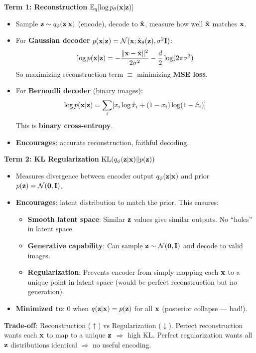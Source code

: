\begin{keybox}
\textbf{Term 1: Reconstruction} $\mathbb{E}_q[\log p_\theta(\mathbf{x}|\mathbf{z})]$
\begin{itemize}
\item Sample $\mathbf{z} \sim q_\phi(\mathbf{z}|\mathbf{x})$ (encode), decode to $\hat{\mathbf{x}}$, measure how well $\hat{\mathbf{x}}$ matches $\mathbf{x}$.
\item For \textbf{Gaussian decoder} $p(\mathbf{x}|\mathbf{z}) = \mathcal{N}(\mathbf{x}; \hat{\mathbf{x}}_\theta(\mathbf{z}), \sigma^2\mathbf{I})$:
$$\log p(\mathbf{x}|\mathbf{z}) = -\frac{\|\mathbf{x} - \hat{\mathbf{x}}\|^2}{2\sigma^2} - \frac{d}{2}\log(2\pi\sigma^2)$$
So maximizing reconstruction term $\equiv$ minimizing \textbf{MSE loss}.
\item For \textbf{Bernoulli decoder} (binary images):
$$\log p(\mathbf{x}|\mathbf{z}) = \sum_i [x_i \log \hat{x}_i + (1-x_i)\log(1-\hat{x}_i)]$$
This is \textbf{binary cross-entropy}.
\item \textbf{Encourages}: accurate reconstruction, faithful decoding.
\end{itemize}

\textbf{Term 2: KL Regularization} $\text{KL}(q_\phi(\mathbf{z}|\mathbf{x}) \| p(\mathbf{z}))$
\begin{itemize}
\item Measures divergence between encoder output $q_\phi(\mathbf{z}|\mathbf{x})$ and prior $p(\mathbf{z}) = \mathcal{N}(\mathbf{0}, \mathbf{I})$.
\item \textbf{Encourages}: latent distribution to match the prior. This ensures:
  \begin{itemize}
  \item \textbf{Smooth latent space}: Similar $\mathbf{z}$ values give similar outputs. No ``holes'' in latent space.
  \item \textbf{Generative capability}: Can sample $\mathbf{z} \sim \mathcal{N}(\mathbf{0}, \mathbf{I})$ and decode to valid images.
  \item \textbf{Regularization}: Prevents encoder from simply mapping each $\mathbf{x}$ to a unique point in latent space (would be perfect reconstruction but no generation).
  \end{itemize}
\item \textbf{Minimized to}: 0 when $q(\mathbf{z}|\mathbf{x}) = p(\mathbf{z})$ for all $\mathbf{x}$ (posterior collapse — bad!).
\end{itemize}

\textbf{Trade-off}: Reconstruction ($\uparrow$) vs Regularization ($\downarrow$). Perfect reconstruction wants each $\mathbf{x}$ to map to a unique $\mathbf{z}$ $\Rightarrow$ high KL. Perfect regularization wants all $\mathbf{z}$ distributions identical $\Rightarrow$ no useful encoding.
\end{keybox}

